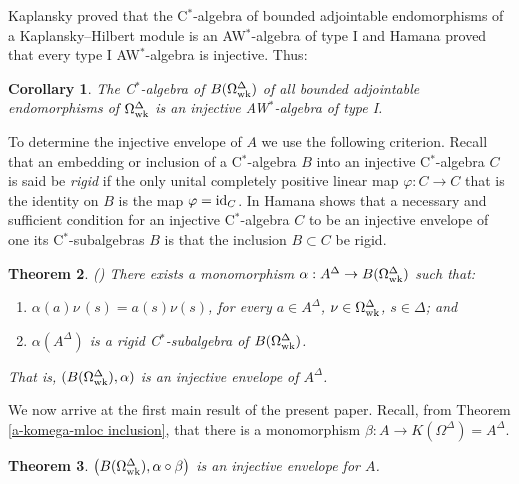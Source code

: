 \documentclass{amsart}
\newtheorem{theorem}{Theorem}[section]
\newtheorem{corollary}[theorem]{Corollary}
\theoremstyle{definition}
\theoremstyle{remark}
\begin{document}
Kaplansky \cite{kaplansky1953} proved that the C$^*$-algebra of bounded adjointable endomorphisms
of a Kaplansky--Hilbert module  is an
AW$^*$-algebra of type I and Hamana \cite{hamana1981} proved that every type I AW$^*$-algebra is injective. Thus:

\begin{corollary}
The C$^*$-algebra of $B(\Omega_{\rm wk}^\Delta)$ of all bounded adjointable endomorphisms of $\Omega_{\rm wk}^\Delta$ is an injective
AW$^*$-algebra of type I.
\end{corollary}

To determine the injective envelope of $A$ we use the following criterion.
Recall that an embedding or inclusion of a C$^*$-algebra $B$ into an injective C$^*$-algebra $C$ is said be \emph{rigid} if the only
unital completely positive linear map $\varphi:C\rightarrow C$ that is the identity on $B$ is the map $\varphi={\rm id}_C$. In \cite{hamana1979b} Hamana shows that
a necessary and sufficient condition for an injective C$^*$-algebra $C$ to be an
injective envelope of one its C$^*$-subalgebras $B$ is that the inclusion $B\subset C$ be rigid.

\begin{theorem}\label{ie stonean} {\rm (\cite{argerami--farenick--massey2010})}
There exists a monomorphism $\alpha:A^\Delta\rightarrow B(\Omega_{\rm wk}^\Delta)$
such that:
\begin{enumerate}
\item $\alpha(a)\nu\,(s)=a(s)\nu(s)$, for every $a\in A^\Delta$, $\nu\in\Omega_{\rm wk}^\Delta$, $s\in\Delta$; and
\item $\alpha(A^\Delta)$ is a rigid C$^*$-subalgebra of $B(\Omega_{\rm wk}^\Delta)$.
\end{enumerate}
That is, $( B(\Omega_{\rm wk}^\Delta),\alpha)$ is an injective envelope of $A^\Delta$.
\end{theorem}

We now arrive at the first main result of the present paper. Recall, from
Theorem \ref{a-komega-mloc inclusion}, that there is a monomorphism
$\beta:A\rightarrow K(\Omega^\Delta)=A^\Delta$.

\begin{theorem}\label{inj env} $\left(B(\Omega_{\rm wk}^\Delta), \alpha\circ\beta \right)$ is an injective envelope for $A$.
\end{theorem}
\end{document}
